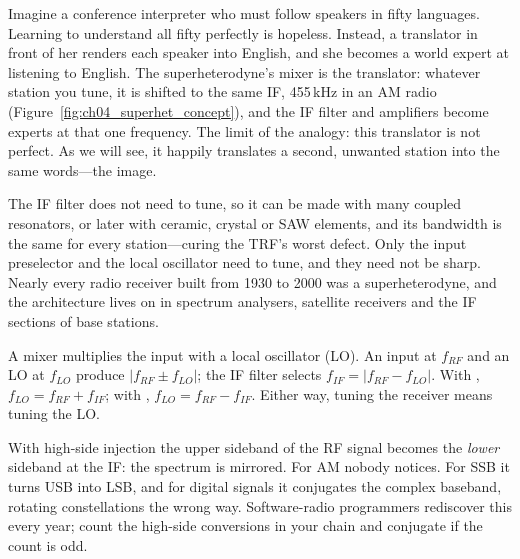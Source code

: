 \begin{analogy}
Imagine a conference interpreter who must follow speakers in fifty languages. Learning to understand all
fifty perfectly is hopeless. Instead, a translator in front of her renders each speaker into English, and
she becomes a world expert at listening to English. The superheterodyne's mixer is the translator: whatever
station you tune, it is shifted to the same IF, 455\,kHz in an AM radio (Figure~\ref{fig:ch04_superhet_concept}),
and the IF filter and amplifiers become experts at that one frequency. The limit of the analogy: this
translator is not perfect. As we will see, it happily translates a second, unwanted station into the same
words---the image.
\end{analogy}


The IF filter does not need to tune, so it can be made with many coupled resonators, or later with ceramic,
crystal or SAW elements, and its bandwidth is the same for every station---curing the TRF's worst defect.
Only the input preselector and the local oscillator need to tune, and they need not be sharp. Nearly every
radio receiver built from 1930 to 2000 was a superheterodyne, and the architecture lives on in spectrum
analysers, satellite receivers and the IF sections of base stations.

A mixer multiplies the input with a local oscillator (LO). An input at $f_{RF}$ and an LO at $f_{LO}$ produce
$|f_{RF}\pm f_{LO}|$; the IF filter selects $f_{IF}=|f_{RF}-f_{LO}|$. With ,
$f_{LO}=f_{RF}+f_{IF}$; with , $f_{LO}=f_{RF}-f_{IF}$. Either way, tuning the receiver
means tuning the LO.

\begin{pitfall}
With high-side injection the upper sideband of the RF signal becomes the \emph{lower} sideband at the IF: the
spectrum is mirrored. For AM nobody notices. For SSB it turns USB into LSB, and for digital signals it
conjugates the complex baseband, rotating constellations the wrong way. Software-radio programmers rediscover
this every year; count the high-side conversions in your chain and conjugate if the count is odd.
\end{pitfall}

